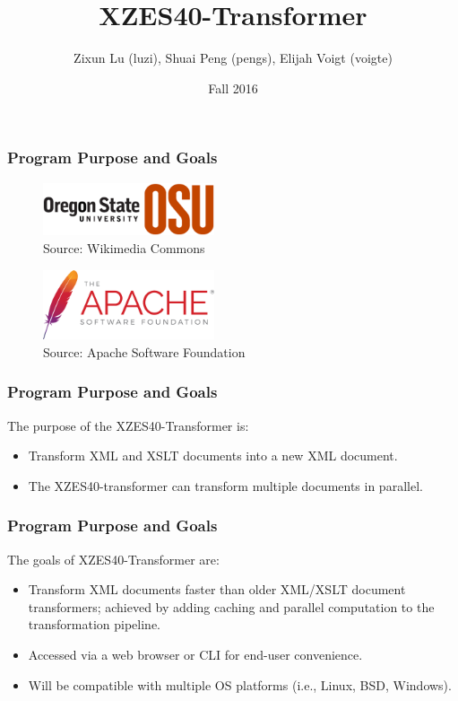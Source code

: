 \documentclass[pdf]{beamer}
\title{XZES40-Transformer}
\author{Zixun Lu (luzi),
  Shuai Peng (pengs),
  Elijah Voigt (voigte)}
\institute{CS 461 | CS Senior Capstone | Group \#40}
\date{Fall 2016}
\begin{document}
 
\frame{\titlepage}

\begin{frame}
  \frametitle{Program Purpose and Goals }
\begin{figure}
	\centering
    \includegraphics[width=0.45\textwidth]{figures/osu-logo}
    \caption{Source: Wikimedia Commons \cite{osu-logo}}
\end{figure}

\begin{figure}
	\centering
    \includegraphics[width=0.45\textwidth]{figures/asf-logo}
    \caption{Source: Apache Software Foundation \cite{asf-logo}}
\end{figure}
\end{frame}

\begin{frame}
  \frametitle{Program Purpose and Goals }
  The purpose of the XZES40-Transformer is:
  \begin{itemize}
	\item Transform XML and XSLT documents into a new XML document.
	\item The XZES40-transformer can transform multiple documents in parallel. 
  \end{itemize}
\end{frame}

\begin{frame}
	\frametitle{Program Purpose and Goals}
    The goals of XZES40-Transformer are:
   	\begin{itemize}
   	\item Transform XML documents faster than older XML/XSLT document transformers; achieved by adding caching and parallel computation to the transformation pipeline.
    \item Accessed via a web browser or CLI for end-user convenience. 
    \item Will be compatible with multiple OS platforms (i.e., Linux, BSD, Windows).
   	\end{itemize}
\end{frame}
\end{document}
